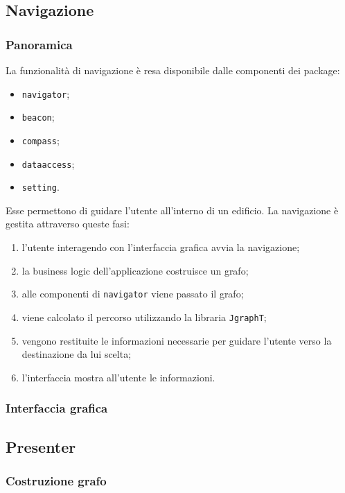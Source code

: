 \documentclass[../Funzionalita.tex]{subfiles}
\begin{document}
\subsection{Navigazione}

		\subsubsection{Panoramica}
			La funzionalità di navigazione è resa disponibile dalle componenti dei package:
			\begin{itemize}
				\item \verb|navigator|;
				\item \verb|beacon|;
				\item \verb|compass|;
				\item \verb|dataaccess|;
				\item \verb|setting|.
			\end{itemize}
			Esse permettono di guidare l'utente all'interno di un edificio.
			La navigazione è gestita attraverso queste fasi:
			\begin{enumerate}
				\item l'utente interagendo con l'interfaccia grafica avvia la navigazione;
				\item la business logic dell'applicazione costruisce un grafo;
				\item alle componenti di \verb|navigator| viene passato il grafo;
				\item viene calcolato il percorso utilizzando la libraria \verb|JgraphT|;
				\item vengono restituite le informazioni necessarie per guidare l'utente verso la destinazione da lui scelta;
				\item l'interfaccia mostra all'utente le informazioni.
			\end{enumerate}
			
		\subsubsection{Interfaccia grafica}
		
		\subsection{Presenter}
		
		\subsubsection{Costruzione grafo}
		
\end{document}
